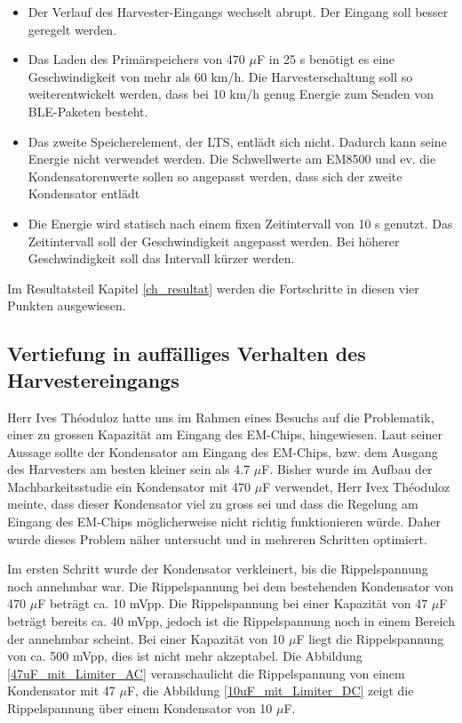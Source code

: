 \begin{itemize}
     \item Der Verlauf des Harvester-Eingangs wechselt abrupt. Der Eingang soll besser geregelt werden. 
     \item Das Laden des Primärspeichers von 470 $\mu$F in 25 s benötigt es eine Geschwindigkeit von mehr als 60 km/h.  Die Harvesterschaltung soll so weiterentwickelt werden, dass bei 10 km/h genug Energie zum Senden von BLE-Paketen besteht.    
     \item Das zweite Speicherelement, der LTS, entlädt sich nicht. Dadurch kann seine Energie nicht verwendet werden. Die Schwellwerte am EM8500 und ev. die Kondensatorenwerte sollen so angepasst werden, dass sich der zweite Kondensator entlädt
     \item Die Energie wird statisch nach einem fixen Zeitintervall von 10 s genutzt. Das Zeitintervall soll der Geschwindigkeit angepasst werden. Bei höherer Geschwindigkeit soll das Intervall kürzer werden.
\end{itemize} 


Im Resultatsteil Kapitel \ref{ch_resultat} werden die Fortschritte in diesen vier Punkten ausgewiesen.

\subsection{Vertiefung in auffälliges Verhalten des Harvestereingangs}\label{auffaellig} 

Herr Ives Théoduloz hatte uns im Rahmen eines Besuchs auf die Problematik, einer zu grossen Kapazität am Eingang des EM-Chips, hingewiesen. Laut seiner Aussage sollte der Kondensator am Eingang des EM-Chips, bzw. dem Ausgang des Harvesters am besten kleiner sein als 4.7 $\mu$F. Bisher wurde im Aufbau der Machbarkeitsstudie ein Kondensator mit 470 $\mu$F verwendet, Herr Ivex Théoduloz meinte, dass dieser Kondensator viel zu gross sei und dass die Regelung am Eingang des EM-Chips möglicherweise nicht richtig funktionieren würde. Daher wurde dieses Problem näher untersucht und in mehreren Schritten optimiert.

Im ersten Schritt wurde der Kondensator verkleinert, bis die Rippelspannung noch annehmbar war. Die Rippelspannung bei dem bestehenden Kondensator von 470 $\mu$F beträgt ca. 10 mVpp. Die Rippelspannung bei einer Kapazität von 47 $\mu$F beträgt bereits ca. 40 mVpp, jedoch ist die Rippelspannung noch in einem Bereich der annehmbar scheint. Bei einer Kapazität von 10 $\mu$F liegt die Rippelspannung von ca. 500 mVpp, dies ist nicht mehr akzeptabel. Die Abbildung \ref{47uF_mit_Limiter_AC} veranschaulicht die Rippelspannung von einem Kondensator mit 47 $\mu$F, die Abbildung \ref{10uF_mit_Limiter_DC} zeigt die Rippelspannung über einem Kondensator von 10 $\mu$F.


